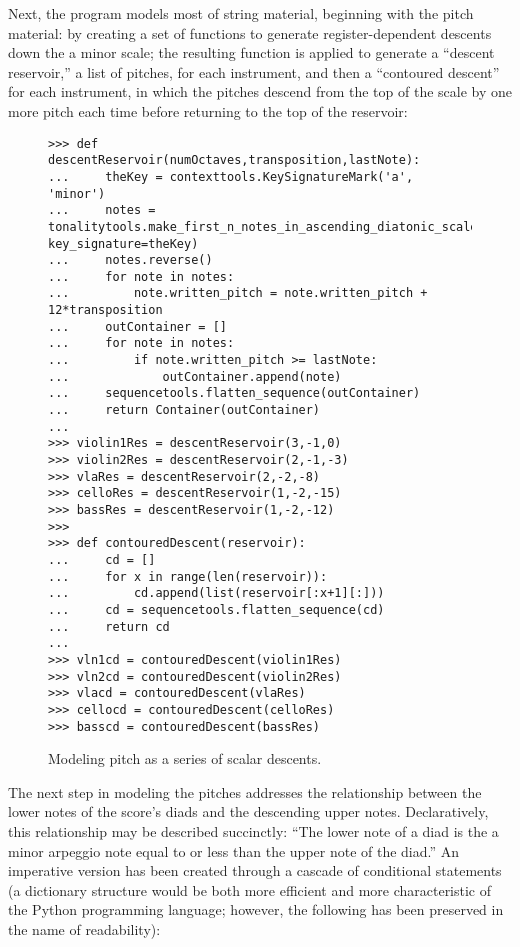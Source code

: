 Next, the program models most of string material, beginning with the pitch material: by creating a set of functions to generate register-dependent descents down the a minor scale; the resulting function is applied to generate a ``descent reservoir,'' a list of pitches, for each instrument, and then a ``contoured descent'' for each instrument, in which the pitches descend from the top of the scale by one more pitch each time before returning to the top of the reservoir:

\begin{figure}[H] 
\begin{lstlisting}[basicstyle=\scriptsize\ttfamily, breaklines=True, tabsize=4, showtabs=false, showspaces=false]
>>> def descentReservoir(numOctaves,transposition,lastNote):
... 	theKey = contexttools.KeySignatureMark('a', 'minor') 
... 	notes = tonalitytools.make_first_n_notes_in_ascending_diatonic_scale(7*numOctaves+1, key_signature=theKey)
... 	notes.reverse()
... 	for note in notes:
... 		note.written_pitch = note.written_pitch + 12*transposition 
... 	outContainer = []
... 	for note in notes:
... 		if note.written_pitch >= lastNote:
... 			outContainer.append(note)
... 	sequencetools.flatten_sequence(outContainer)
... 	return Container(outContainer)
... 
>>> violin1Res = descentReservoir(3,-1,0)
>>> violin2Res = descentReservoir(2,-1,-3)
>>> vlaRes = descentReservoir(2,-2,-8)
>>> celloRes = descentReservoir(1,-2,-15)
>>> bassRes = descentReservoir(1,-2,-12)
>>> 
>>> def contouredDescent(reservoir):
... 	cd = []
... 	for x in range(len(reservoir)):
... 		cd.append(list(reservoir[:x+1][:]))
... 	cd = sequencetools.flatten_sequence(cd)
... 	return cd
... 
>>> vln1cd = contouredDescent(violin1Res)
>>> vln2cd = contouredDescent(violin2Res)
>>> vlacd = contouredDescent(vlaRes)
>>> cellocd = contouredDescent(celloRes)
>>> basscd = contouredDescent(bassRes)\end{lstlisting}

\caption{Modeling pitch as a series of scalar descents. } 
\end{figure}

The next step in modeling the pitches addresses the relationship between the lower notes of the score's diads and the descending upper notes. Declaratively, this relationship may be described succinctly: ``The lower note of a diad is the a minor arpeggio note equal to or less than the upper note of the diad.'' An imperative version has been created through a cascade of conditional statements (a dictionary structure would be both more efficient and more characteristic of the Python programming language; however, the following has been preserved in the name of readability):

